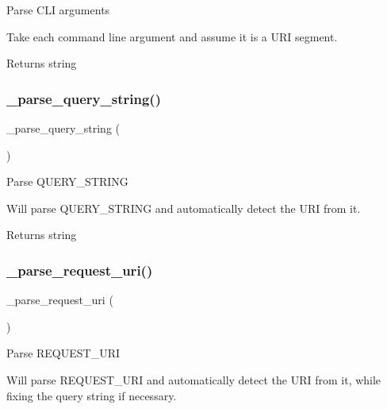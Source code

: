 Parse C\+LI arguments

Take each command line argument and assume it is a U\+RI segment.

\begin{DoxyReturn}{Returns}
string 
\end{DoxyReturn}
\mbox{\label{class_c_i___u_r_i_a2bb6abbe64a923ffef79a4a4c3da93db}} 
\subsubsection{\texorpdfstring{\+\_\+parse\+\_\+query\+\_\+string()}{\_parse\_query\_string()}}
{\footnotesize\ttfamily \+\_\+parse\+\_\+query\+\_\+string (\begin{DoxyParamCaption}{ }\end{DoxyParamCaption})\hspace{0.3cm}{\ttfamily [protected]}}

Parse Q\+U\+E\+R\+Y\+\_\+\+S\+T\+R\+I\+NG

Will parse Q\+U\+E\+R\+Y\+\_\+\+S\+T\+R\+I\+NG and automatically detect the U\+RI from it.

\begin{DoxyReturn}{Returns}
string 
\end{DoxyReturn}
\mbox{\label{class_c_i___u_r_i_ae2e75a6f6657df51c7b6de926979af29}} 
\subsubsection{\texorpdfstring{\+\_\+parse\+\_\+request\+\_\+uri()}{\_parse\_request\_uri()}}
{\footnotesize\ttfamily \+\_\+parse\+\_\+request\+\_\+uri (\begin{DoxyParamCaption}{ }\end{DoxyParamCaption})\hspace{0.3cm}{\ttfamily [protected]}}

Parse R\+E\+Q\+U\+E\+S\+T\+\_\+\+U\+RI

Will parse R\+E\+Q\+U\+E\+S\+T\+\_\+\+U\+RI and automatically detect the U\+RI from it, while fixing the query string if necessary.

